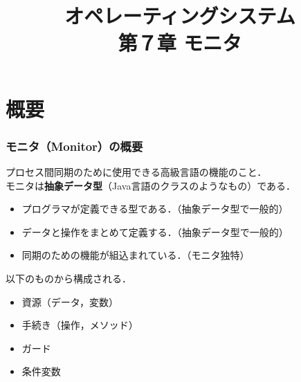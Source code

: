 \documentclass[dvipdfmx]{beamer}
\begin{document}
\title[OS]{オペレーティングシステム\\第７章 モニタ}
\date{}

\begin{frame}
  \titlepage
\end{frame}


\section{概要}
\begin{frame}
  \frametitle{モニタ（Monitor）の概要}

プロセス間同期のために使用できる高級言語の機能のこと．\\
モニタは{\bf 抽象データ型}（Java言語のクラスのようなもの）である．

\begin{itemize}
\item プログラマが定義できる型である．（抽象データ型で一般的）
\item データと操作をまとめて定義する．（抽象データ型で一般的）
\item 同期のための機能が組込まれている．（モニタ独特）
\end{itemize}

\vspace{1ex}

以下のものから構成される．
\begin{itemize}
\item 資源（データ，変数）
\item 手続き（操作，メソッド）
\item ガード
\item 条件変数
\end{itemize}
\end{frame}
\end{document}
